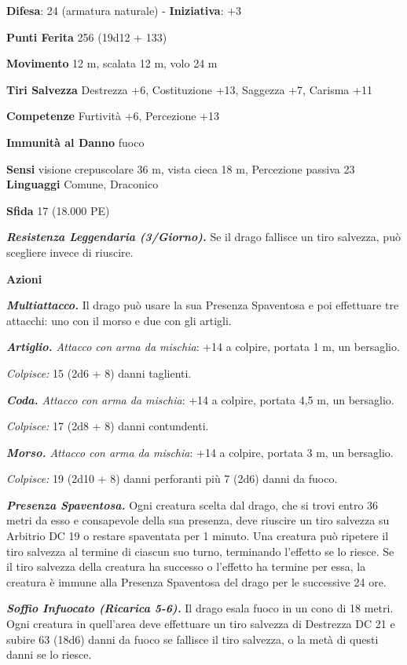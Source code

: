\begin{multicols}{2}
\textbf{Difesa}: 24 (armatura naturale) - \textbf{Iniziativa}: +3

\textbf{Punti Ferita} 256 (19d12 + 133)

\textbf{Movimento} 12 m, scalata 12 m, volo 24 m

\textbf{Tiri Salvezza} Destrezza +6, Costituzione +13, Saggezza +7,
Carisma +11

\textbf{Competenze} Furtività +6, Percezione +13

\textbf{Immunità al Danno} fuoco

\textbf{Sensi} visione crepuscolare 36 m, vista cieca 18 m, Percezione passiva
23 \textbf{Linguaggi} Comune, Draconico

\textbf{Sfida} 17 (18.000 PE)\smallskip

\emph{\textbf{Resistenza Leggendaria (3/Giorno).}} Se il drago fallisce
un tiro salvezza, può scegliere invece di riuscire.

\smallskip\textbf{Azioni}

\emph{\textbf{Multiattacco.}} Il drago può usare la sua Presenza
Spaventosa e poi effettuare tre attacchi: uno con il morso e due con gli
artigli.

\emph{\textbf{Artiglio.} Attacco con arma da mischia}: +14 a colpire,
portata 1 m, un bersaglio.

\emph{Colpisce:} 15 (2d6 + 8) danni taglienti.

\emph{\textbf{Coda.} Attacco con arma da mischia}: +14 a colpire,
portata 4,5 m, un bersaglio.

\emph{Colpisce:} 17 (2d8 + 8) danni contundenti.

\emph{\textbf{Morso.} Attacco con arma da mischia}: +14 a colpire,
portata 3 m, un bersaglio.

\emph{Colpisce:} 19 (2d10 + 8) danni perforanti più 7 (2d6) danni da
fuoco.

\emph{\textbf{Presenza Spaventosa.}} Ogni creatura scelta dal drago, che
si trovi entro 36 metri da esso e consapevole della sua presenza, deve
riuscire un tiro salvezza su Arbitrio DC 19 o restare spaventata per 1
minuto. Una creatura può ripetere il tiro salvezza al termine di ciascun
suo turno, terminando l'effetto se lo riesce. Se il tiro salvezza della
creatura ha successo o l'effetto ha termine per essa, la creatura è
immune alla Presenza Spaventosa del drago per le successive 24 ore.

\emph{\textbf{Soffio Infuocato (Ricarica 5-6).}} Il drago esala fuoco in
un cono di 18 metri. Ogni creatura in quell'area deve effettuare un tiro
salvezza di Destrezza DC 21 e subire 63 (18d6) danni da fuoco se
fallisce il tiro salvezza, o la metà di questi danni se lo riesce.


\end{multicols}

